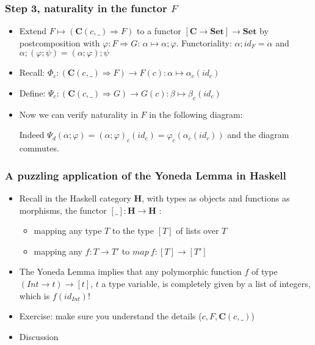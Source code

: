 \documentclass[handout]{beamer}
\newcommand{\To}{\Rightarrow}
\newcommand{\bfsf}[1]{{\boldsymbol{#1}}}
\newcommand{\Set}{\bfsf{Set}}
\newcommand{\CC}{\bfsf{C}}
\newcommand{\HH}{\bfsf{H}}
\begin{document}
\frame
  {   
    \frametitle{Step 3, naturality in the functor $F$}\label{Yon:natural_in_F}

 \begin{itemize}[<+->]
\item Extend $F\mapsto(\CC(c,\_)\To F)$ to a functor $[\CC\to\Set]\to\Set$
by postcomposition with $\varphi:F\To G$: 
$\alpha \mapsto \alpha;\varphi$. %
Functoriality: 
$\alpha;id_F = \alpha$ and $\alpha;(\varphi;\psi) = (\alpha;\varphi);\psi$
\item Recall: $\Phi_c : (\CC(c,\_)\To F) \to F(c): \alpha\mapsto \alpha_c(id_c)$
\item Define: $\Psi_c : (\CC(c,\_)\To G) \to G(c): \beta\mapsto \beta_c(id_c)$
\item Now we can verify naturality in $F$ in the following diagram:

Indeed $\Psi_d(\alpha;\varphi) = (\alpha;\varphi)_c(id_c) = \varphi_c(\alpha_c(id_c))$
and the diagram commutes.
 \end{itemize}

 }

\frame
  {   
    \frametitle{A puzzling application of the Yoneda Lemma in Haskell}\label{Yon:Hask}

 \begin{itemize}[<+->]
\item Recall in the Haskell category $\HH$, with types as objects and 
functions as morphisms, the functor $[\_]:\HH\to\HH$ :
   \begin{itemize}[<+->]
\item mapping any type $T$ to the type $[T]$ of lists over $T$
\item mapping any $f: T\to T'$ to $map~f: [T] \to [T']$
   \end{itemize}
\item The Yoneda Lemma implies that any polymorphic function
$f$ of type $(Int\to t) \to [t]$, $t$ a type variable,
is completely given by a list of integers, which is $f(id_{Int})$!
\item Exercise: make sure you understand the details ($c,F,\CC(c,\_)$) %
\item Discussion
 \end{itemize}

 }
\end{document}
